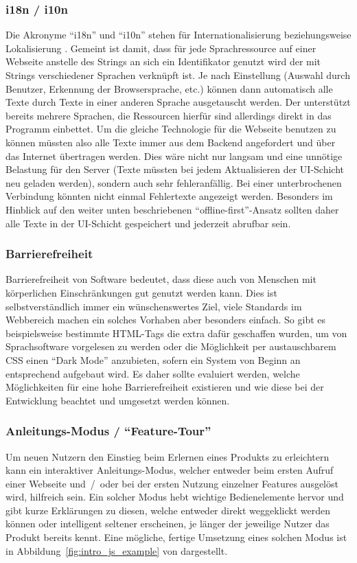 \subsubsection{i18n / i10n}
Die Akronyme ``i18n'' und ``i10n'' stehen für Internationalisierung beziehungsweise Lokalisierung \parencite{i18n_i10n_ishida_w3c_miller_boeing_2018}. Gemeint ist damit, dass für jede Sprachressource auf einer Webseite anstelle des Strings an sich ein Identifikator genutzt wird der mit Strings verschiedener Sprachen verknüpft ist. Je nach Einstellung (Auswahl durch Benutzer, Erkennung der Browsersprache, etc.) können dann automatisch alle Texte durch Texte in einer anderen Sprache ausgetauscht werden. Der  unterstützt bereits mehrere Sprachen, die Ressourcen hierfür sind allerdings direkt in das Programm einbettet. Um die gleiche Technologie für die Webseite benutzen zu können müssten also alle Texte immer aus dem Backend angefordert und über das Internet übertragen werden. Dies wäre nicht nur langsam und eine unnötige Belastung für den Server (Texte müssten bei jedem Aktualisieren der UI-Schicht neu geladen werden), sondern auch sehr fehleranfällig. Bei einer unterbrochenen Verbindung könnten nicht einmal Fehlertexte angezeigt werden. Besonders im Hinblick auf den weiter unten beschriebenen ``offline-first''-Ansatz sollten daher alle Texte in der UI-Schicht gespeichert und jederzeit abrufbar sein.

\subsubsection{Barrierefreiheit}
Barrierefreiheit von Software bedeutet, dass diese auch von Menschen mit körperlichen Einschränkungen gut genutzt werden kann. Dies ist selbstverständlich immer ein wünschenswertes Ziel, viele Standards im Webbereich machen ein solches Vorhaben aber besonders einfach. So gibt es beispielsweise bestimmte HTML-Tags die extra dafür geschaffen wurden, um von Sprachsoftware vorgelesen zu werden oder die Möglichkeit per austauschbarem CSS einen ``Dark Mode'' anzubieten, sofern ein System von Beginn an entsprechend aufgebaut wird.
Es daher sollte evaluiert werden, welche Möglichkeiten für eine hohe Barrierefreiheit existieren und wie diese bei der Entwicklung beachtet und umgesetzt werden können.

\subsubsection{Anleitungs-Modus / ``Feature-Tour''}
 Um neuen Nutzern den Einstieg beim Erlernen eines Produkts zu erleichtern kann ein interaktiver Anleitungs-Modus, welcher entweder beim ersten Aufruf einer Webseite und~/~oder bei der ersten Nutzung einzelner Features ausgelöst wird, hilfreich sein. Ein solcher Modus hebt wichtige Bedienelemente hervor und gibt kurze Erklärungen zu diesen, welche entweder direkt weggeklickt werden können oder intelligent seltener erscheinen, je länger der jeweilige Nutzer das Produkt bereits kennt. Eine mögliche, fertige Umsetzung eines solchen Modus ist in Abbildung~\ref{fig:intro_js_example} von  dargestellt.

